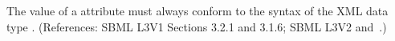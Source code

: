 The value of a  attribute must always conform to the syntax
of the XML data type .  (References: SBML L3V1 Sections 3.2.1 and 3.1.6; SBML L3V2
 and~.)
